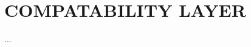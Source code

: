 \documentclass[../report.tex]{subfiles}
\begin{document}
\section{COMPATABILITY LAYER}

...
\end{document}
